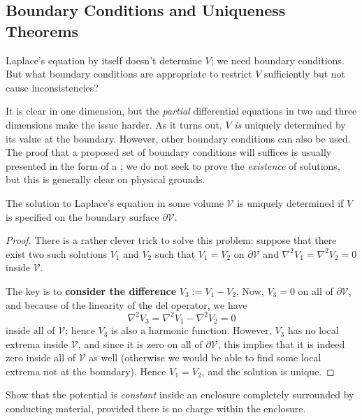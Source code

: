 \subsection{Boundary Conditions and Uniqueness Theorems}\label{boundconduniqthm}

Laplace's equation by itself doesn't determine $V$; we need boundary conditions. But what boundary conditions are appropriate to restrict $V$ sufficiently but not cause inconsistencies?

It is clear in one dimension, but the \textit{partial} differential equations in two and three dimensions make the issue harder.  As it turns out, $V$ \textit{is} uniquely determined by its value at the boundary. However, other boundary conditions can also be used. The proof that a proposed set of boundary conditions will suffices is usually presented in the form of a ; we do not seek to prove the \textit{existence} of solutions, but this is generally clear on physical grounds.

\begin{theorem}
    The solution to Laplace's equation in some volume $\mathcal{V}$ is uniquely determined if $V$ is specified on the boundary surface $\partial\mathcal{V}$.
\end{theorem}

\begin{proof}
There is a rather clever trick to solve this problem: suppose that there exist two such solutions $V_1$ and $V_2$ such that $V_1=V_2$ on $\partial\mathcal{V}$ and $\nabla^2 V_1=\nabla^2 V_2=0$ inside $\mathcal{V}$.

The key is to \textbf{consider the difference} $V_3:=V_1-V_2$. Now, $V_3=0$ on all of $\partial \mathcal{V}$, and because of the linearity of the del operator, we have
\[\nabla^2V_3=\nabla^2 V_1-\nabla^2V_2=0\]
inside all of $\mathcal{V}$; hence $V_3$ is also a harmonic function. However, $V_3$ has no local extrema inside $\mathcal{V}$, and since it is zero on all of $\partial\mathcal{V}$, this implies that it is indeed zero inside all of $\mathcal{V}$ as well (otherwise we would be able to find some local extrema not at the boundary). Hence $V_1=V_2$, and the solution is unique.
\end{proof}

\begin{example}
Show that the potential is \textit{constant} inside an enclosure completely surrounded by conducting material, provided there is no charge within the enclosure.
\end{example}

